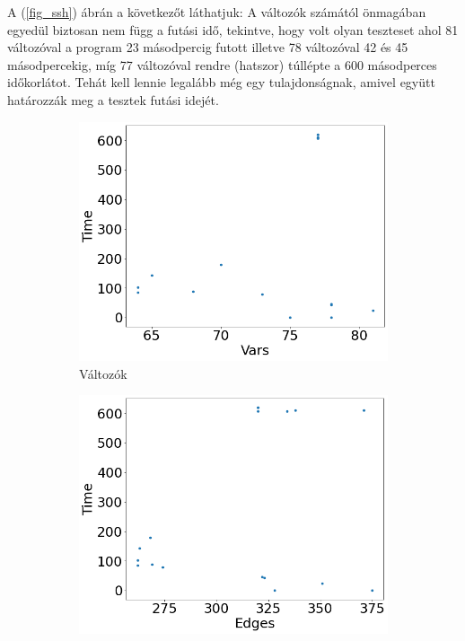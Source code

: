 A (\ref{fig_ssh}) ábrán a következőt láthatjuk: A változók számától önmagában egyedül biztosan nem függ a futási idő, tekintve, hogy volt olyan teszteset ahol 81 változóval a program 23 másodpercig futott illetve 78 változóval 42 és 45 másodpercekig, míg 77 változóval rendre (hatszor) túllépte a 600 másodperces időkorlátot. Tehát kell lennie legalább még egy tulajdonságnak, amivel együtt határozzák meg a tesztek futási idejét.

\begin{figure}[ht] 
	\begin{subfigure}[b]{0.5\linewidth}
		\centering
		\includegraphics[width=0.95\linewidth]{figures/ssh/vars.png} 
		\caption{Változók} 
		\label{fig7:a} 
		\vspace{4ex}
	\end{subfigure}%
	\begin{subfigure}[b]{0.5\linewidth}
		\centering
		\includegraphics[width=0.95\linewidth]{figures/ssh/edges.png} 

\end{subfigure}
\end{figure}
